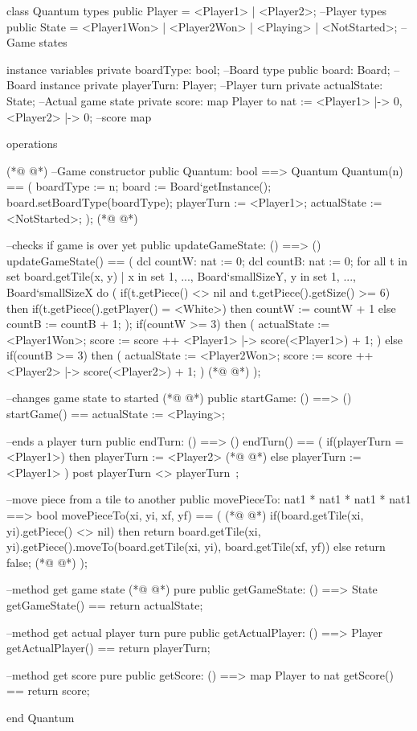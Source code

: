 \begin{vdmpp}[breaklines=true]
class Quantum
types
  public Player = <Player1> | <Player2>; --Player types
  public State = <Player1Won> | <Player2Won> | <Playing> | <NotStarted>; --Game states

instance variables
  private boardType: bool; --Board type
  public board: Board; --Board instance
  private playerTurn: Player; --Player turn
  private actualState: State; --Actual game state
  private score: map Player to nat := {<Player1> |-> 0, <Player2> |-> 0}; --score map
 
operations
  
(*@
\label{Quantum:15}
@*)
  --Game constructor
  public Quantum: bool ==> Quantum
    Quantum(n) == (
   boardType := n;
   board := Board`getInstance();
   board.setBoardType(boardType);
   playerTurn := <Player1>;
   actualState := <NotStarted>;
    );      
(*@
\label{updateGameState:24}
@*)
      
    --checks if game is over yet          
    public updateGameState: () ==> ()
    updateGameState() == (
      dcl countW: nat := 0;
      dcl countB: nat := 0;
      for all t in set {board.getTile(x, y) | x in set {1, ..., Board`smallSizeY}, y in set {1, ..., Board`smallSizeX}} 
       do (
        if(t.getPiece() <> nil and t.getPiece().getSize() >= 6) then
         if(t.getPiece().getPlayer() = <White>) then countW := countW + 1
         else countB := countB + 1;
       );
      if(countW >= 3) then (
       actualState := <Player1Won>;
       score := score ++ {<Player1> |-> score(<Player1>) + 1};
       )
      else if(countB >= 3) then (
       actualState := <Player2Won>;
       score := score ++ {<Player2> |-> score(<Player2>) + 1};
       )
(*@
\label{startGame:44}
@*)
    );   
    
    --changes game state to started      
(*@
\label{endTurn:47}
@*)
    public startGame: () ==> ()
    startGame() == actualState := <Playing>;  
    
    --ends a player turn
    public endTurn: () ==> ()
    endTurn() == (
     if(playerTurn = <Player1>) then playerTurn := <Player2>
(*@
\label{movePieceTo:54}
@*)
     else playerTurn := <Player1>
    )
    post playerTurn <> playerTurn~;
    
    --move piece from a tile to another
    public movePieceTo: nat1 * nat1 * nat1 * nat1 ==> bool
    movePieceTo(xi, yi, xf, yf) == (
(*@
\label{getGameState:61}
@*)
     if(board.getTile(xi, yi).getPiece() <> nil)
      then return board.getTile(xi, yi).getPiece().moveTo(board.getTile(xi, yi), board.getTile(xf, yf))
     else return false;
(*@
\label{getActualPlayer:64}
@*)
    );
    
    --method get game state
(*@
\label{getScore:67}
@*)
    pure public getGameState: () ==> State
    getGameState() == return actualState;
    
    --method get actual player turn
    pure public getActualPlayer: () ==> Player
    getActualPlayer() == return playerTurn;
    
    --method get score
    pure public getScore: () ==> map Player to nat
    getScore() == return score;
    
end Quantum
\end{vdmpp}
